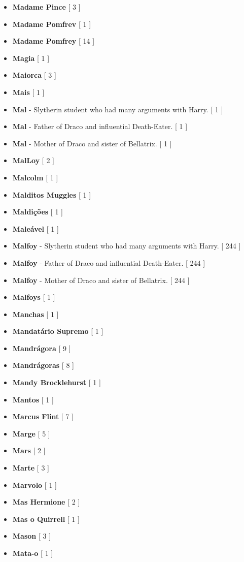 \documentclass[a4paper]{article}
\begin{document}
\begin{itemize}
	\item \textbf{Madame Pince} [ 3 ]
	\item \textbf{Madame Pomfrev} [ 1 ]
	\item \textbf{Madame Pomfrey} [ 14 ]
	\item \textbf{Magia} [ 1 ]
	\item \textbf{Maiorca} [ 3 ]
	\item \textbf{Mais} [ 1 ]
	\item \textbf{Mal} - Slytherin student who had many arguments with Harry. [ 1 ]
	\item \textbf{Mal} - Father of Draco and influential Death-Eater. [ 1 ]
	\item \textbf{Mal} - Mother of Draco and sister of Bellatrix. [ 1 ]
	\item \textbf{MalLoy} [ 2 ]
	\item \textbf{Malcolm} [ 1 ]
	\item \textbf{Malditos Muggles} [ 1 ]
	\item \textbf{Maldições} [ 1 ]
	\item \textbf{Maleável} [ 1 ]
	\item \textbf{Malfoy} - Slytherin student who had many arguments with Harry. [ 244 ]
	\item \textbf{Malfoy} - Father of Draco and influential Death-Eater. [ 244 ]
	\item \textbf{Malfoy} - Mother of Draco and sister of Bellatrix. [ 244 ]
	\item \textbf{Malfoys} [ 1 ]
	\item \textbf{Manchas} [ 1 ]
	\item \textbf{Mandatário Supremo} [ 1 ]
	\item \textbf{Mandrágora} [ 9 ]
	\item \textbf{Mandrágoras} [ 8 ]
	\item \textbf{Mandy Brocklehurst} [ 1 ]
	\item \textbf{Mantos} [ 1 ]
	\item \textbf{Marcus Flint} [ 7 ]
	\item \textbf{Marge} [ 5 ]
	\item \textbf{Mars} [ 2 ]
	\item \textbf{Marte} [ 3 ]
	\item \textbf{Marvolo} [ 1 ]
	\item \textbf{Mas Hermione} [ 2 ]
	\item \textbf{Mas o Quirrell} [ 1 ]
	\item \textbf{Mason} [ 3 ]
	\item \textbf{Mata-o} [ 1 ]

\end{itemize}
\end{document}
